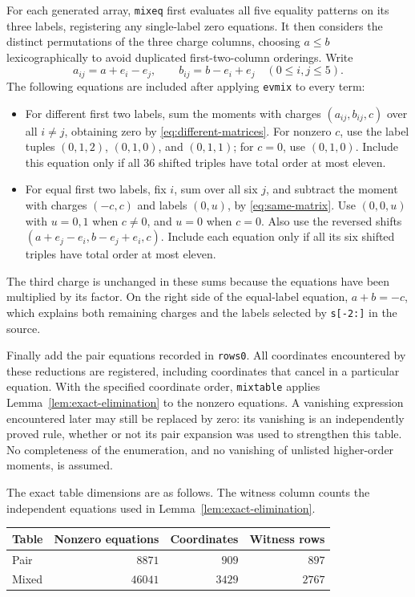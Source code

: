 For each generated array, \texttt{mixeq} first evaluates all five
equality patterns on its three labels, registering any single-label
zero equations.  It then considers the distinct permutations of the
three charge columns, choosing $a\le b$ lexicographically to avoid
duplicated first-two-column orderings.  Write
\[
 a_{ij}=a+e_i-e_j,\qquad b_{ij}=b-e_i+e_j
 \quad (0\le i,j\le5).
\]
The following equations are included after applying \texttt{evmix} to
every term:
\begin{itemize}
 \item For different first two labels, sum the moments with charges
 $(a_{ij},b_{ij},c)$ over all $i\ne j$, obtaining zero by
 \eqref{eq:different-matrices}.  For nonzero $c$, use the label tuples
 $(0,1,2)$, $(0,1,0)$, and $(0,1,1)$; for $c=0$, use $(0,1,0)$.
 Include this equation only if all $36$ shifted triples have total
 order at most eleven.
 \item For equal first two labels, fix $i$, sum over all six $j$, and
 subtract the moment with charges $(-c,c)$ and labels $(0,u)$, by
 \eqref{eq:same-matrix}.  Use $(0,0,u)$ with $u=0,1$ when $c\ne0$,
 and $u=0$ when $c=0$.  Also use the reversed shifts
 $(a+e_j-e_i,b-e_j+e_i,c)$.  Include each equation only if all its six
 shifted triples have total order at most eleven.
\end{itemize}
The third charge is unchanged in these sums because the equations have
been multiplied by its factor.  On the right side of the equal-label
equation, $a+b=-c$, which explains both remaining charges and the
labels selected by \texttt{s[-2:]} in the source.

Finally add the pair equations recorded in \texttt{rows0}.  All
coordinates encountered by these reductions are registered, including
coordinates that cancel in a particular equation.  With the specified
coordinate order, \texttt{mixtable} applies
Lemma~\ref{lem:exact-elimination} to the nonzero equations.  A vanishing
expression encountered later may still be replaced by zero: its
vanishing is an independently proved rule, whether or not its pair
expansion was used to strengthen this table.  No completeness of the
enumeration, and no vanishing of unlisted higher-order moments, is
assumed.

The exact table dimensions are as follows.  The witness column counts
the independent equations used in Lemma~\ref{lem:exact-elimination}.
\begin{center}
\begin{tabular}{lrrr}
\toprule
Table & Nonzero equations & Coordinates & Witness rows \\
\midrule
Pair  & $8871$  & $909$  & $897$ \\
Mixed & $46041$ & $3429$ & $2767$ \\
\bottomrule
\end{tabular}
\end{center}

